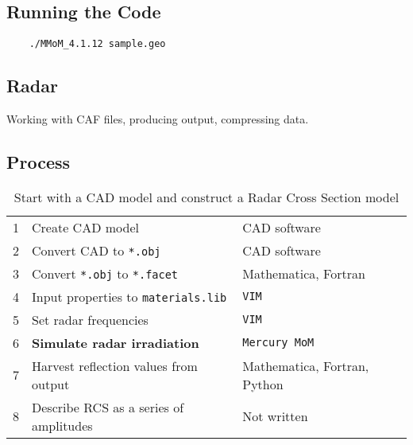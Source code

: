 \subsection{Running the Code}

\begin{verbatim}
	./MMoM_4.1.12 sample.geo
\end{verbatim}

\subsection{Radar}

\autocite{topa20200303}
\parencite{topa20200303}
Working with CAF files, producing output, compressing data.
\cite{topa-4-20-2024}
\textcite{topa-4-20-2024}


\subsection{Process}
\begin{table}[htp]
\begin{center}
\begin{tabular}{lll}
	1 & Create CAD model	& CAD software \\
	2 & Convert CAD to \texttt{*.obj}	& CAD software \\
	3 & Convert \texttt{*.obj} to \texttt{*.facet} & Mathematica, Fortran \\
	4 & Input  properties to \texttt{materials.lib}	& \texttt{VIM} \\
	5 & Set radar frequencies & \texttt{VIM} \\
	6 & \bf{Simulate radar irradiation} & \texttt{Mercury MoM} \\
	7 & Harvest reflection values from output & Mathematica, Fortran, Python \\
	8 & Describe RCS as a series of amplitudes & Not written
\end{tabular}
\end{center}
\caption{Start with a CAD model and construct a Radar Cross Section model}
\label{tab:process}
\end{table}%



\endinput  %

